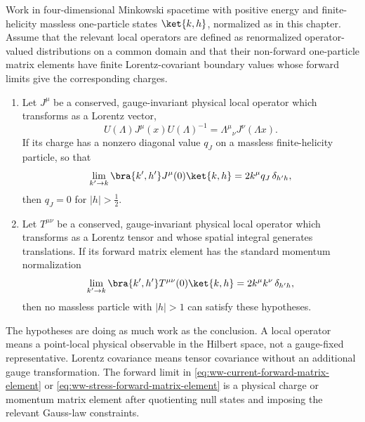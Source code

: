\begin{theorem}
\label{thm:weinberg-witten-four-dimensional-helicity}
Work in four-dimensional Minkowski spacetime with positive energy and
finite-helicity massless one-particle states \(\ket{k,h}\), normalized as in
this chapter.  Assume that the relevant local operators are defined as
renormalized operator-valued distributions on a common domain and that their
non-forward one-particle matrix elements have finite Lorentz-covariant
boundary values whose forward limits give the corresponding charges.

\begin{enumerate}
\item Let \(J^\mu\) be a conserved, gauge-invariant physical local operator
which transforms as a Lorentz vector,
\[
  U(\Lambda)J^\mu(x)U(\Lambda)^{-1}
  =
  \Lambda^\mu{}_\nu J^\nu(\Lambda x).
\]
If its charge has a nonzero diagonal value \(q_J\) on a massless
finite-helicity particle, so that
\begin{equation}
  \lim_{k'\to k}
  \bra{k',h'}J^\mu(0)\ket{k,h}
  =
  2k^\mu q_J\,\delta_{h'h},
  \label{eq:ww-current-forward-matrix-element}
\end{equation}
then \(q_J=0\) for \(|h|>\frac12\).

\item Let \(T^{\mu\nu}\) be a conserved, gauge-invariant physical local
operator which transforms as a Lorentz tensor and whose spatial integral
generates translations.  If its forward matrix element has the standard
momentum normalization
\begin{equation}
  \lim_{k'\to k}
  \bra{k',h'}T^{\mu\nu}(0)\ket{k,h}
  =
  2k^\mu k^\nu\,\delta_{h'h},
  \label{eq:ww-stress-forward-matrix-element}
\end{equation}
then no massless particle with \(|h|>1\) can satisfy these hypotheses.
\end{enumerate}
\end{theorem}

The hypotheses are doing as much work as the conclusion.  A local operator
means a point-local physical observable in the Hilbert space, not a gauge-fixed
representative.  Lorentz covariance means tensor covariance without an
additional gauge transformation.  The forward limit in
\eqref{eq:ww-current-forward-matrix-element} or
\eqref{eq:ww-stress-forward-matrix-element} is a physical charge or momentum
matrix element after quotienting null states and imposing the relevant
Gauss-law constraints.

